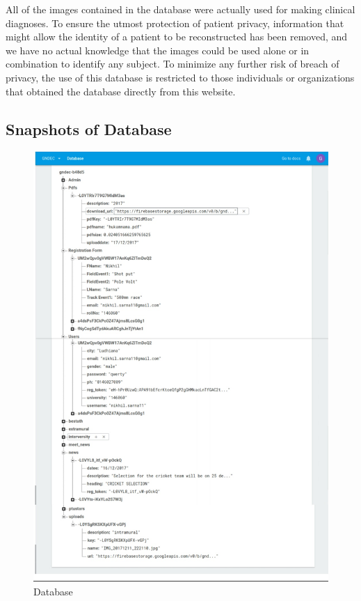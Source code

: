 All of the images contained in the database were actually used for making clinical diagnoses. To ensure the utmost protection of patient privacy, information that might allow the identity of a patient to be reconstructed has been removed, and we have no actual knowledge that the images could be used alone or in combination to identify any subject. To minimize any further risk of breach of privacy, the use of this database is restricted to those individuals or organizations that obtained the database directly from this website.

\newpage
\subsection{Snapshots of Database}
\begin{figure}[ht]
		\centering
		\includegraphics[scale=0.30]{images/dbfire.jpg}
		\caption{Database}
	\end{figure}



